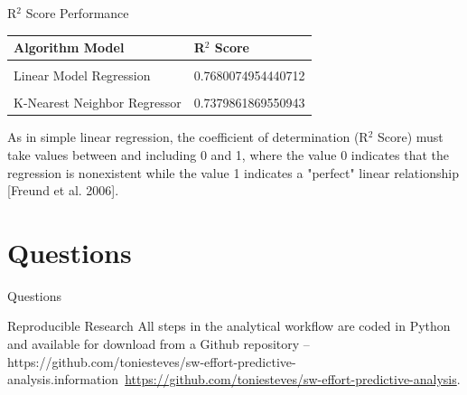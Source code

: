 \documentclass{beamer}
\begin{document}
\begin{frame}{R$^{2}$ Score Performance}
   \begin{block}{}
   
   	\begin{table}[H]
    \centering
    \label{tab:modelResultsTable2}
    \smallskip
    \begin{tabular}{|l|l|}
    \hline
    \textbf{Algorithm Model} & \textbf{R$^{2}$ Score}\\[0.5ex]
    \hline
    &\\[-2ex]
    Linear Model Regression & 0.7680074954440712\\[0.5ex]
    \hline
    &\\[-2ex]
    K-Nearest Neighbor Regressor & 0.7379861869550943\\[0.5ex]
    \hline
    \end{tabular}
    \end{table}
    
    As in simple linear regression, the coefficient of determination (R$^{2}$ Score) must take values between and including 0 and 1, where the value 0 indicates that the regression is nonexistent while the value 1 indicates a "perfect" linear relationship [Freund et al. 2006].
\end{block}
\end{frame}

\section{Questions}
\begin{frame}{Questions}
	\begin{block}{Reproducible Research}
	All steps in the analytical workflow are coded in Python and available for download from a Github repository – https://github.com/toniesteves/sw-effort-predictive-analysis.information~\url{https://github.com/toniesteves/sw-effort-predictive-analysis}. 
	\end{block}
\end{frame}



\end{document}
